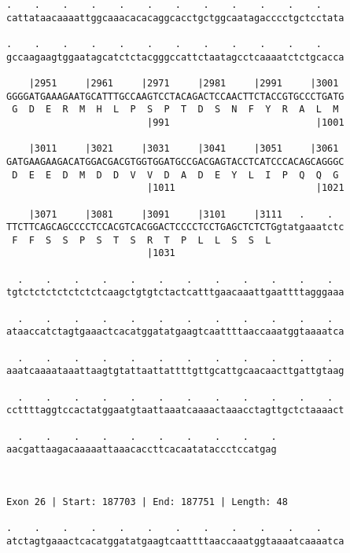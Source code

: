 \documentclass{article}
\begin{document}
\begin{Verbatim}
.    .    .    .    .    .    .    .    .    .    .    .    
cattataacaaaattggcaaacacacaggcacctgctggcaatagacccctgctcctata
                                                            
.    .    .    .    .    .    .    .    .    .    .    .    
gccaagaagtggaatagcatctctacgggccattctaatagcctcaaaatctctgcacca
                                                            
    |2951     |2961     |2971     |2981     |2991     |3001 
GGGGATGAAAGAATGCATTTGCCAAGTCCTACAGACTCCAACTTCTACCGTGCCCTGATG
 G  D  E  R  M  H  L  P  S  P  T  D  S  N  F  Y  R  A  L  M 
                         |991                          |1001
  
    |3011     |3021     |3031     |3041     |3051     |3061 
GATGAAGAAGACATGGACGACGTGGTGGATGCCGACGAGTACCTCATCCCACAGCAGGGC
 D  E  E  D  M  D  D  V  V  D  A  D  E  Y  L  I  P  Q  Q  G 
                         |1011                         |1021
  
    |3071     |3081     |3091     |3101     |3111   .    .  
TTCTTCAGCAGCCCCTCCACGTCACGGACTCCCCTCCTGAGCTCTCTGgtatgaaatctc
 F  F  S  S  P  S  T  S  R  T  P  L  L  S  S  L             
                         |1031                              
  
  .    .    .    .    .    .    .    .    .    .    .    .  
tgtctctctctctctctcaagctgtgtctactcatttgaacaaattgaattttagggaaa
                                                            
  .    .    .    .    .    .    .    .    .    .    .    .  
ataaccatctagtgaaactcacatggatatgaagtcaattttaaccaaatggtaaaatca
                                                            
  .    .    .    .    .    .    .    .    .    .    .    .  
aaatcaaaataaattaagtgtattaattattttgttgcattgcaacaacttgattgtaag
                                                            
  .    .    .    .    .    .    .    .    .    .    .    .  
ccttttaggtccactatggaatgtaattaaatcaaaactaaacctagttgctctaaaact
                                                            
  .    .    .    .    .    .    .    .    .    .
aacgattaagacaaaaattaaacaccttcacaatataccctccatgag
                                                
                                                
 
Exon 26 | Start: 187703 | End: 187751 | Length: 48
 
.    .    .    .    .    .    .    .    .    .    .    .    
atctagtgaaactcacatggatatgaagtcaattttaaccaaatggtaaaatcaaaatca
                                                            

\end{Verbatim}
\end{document}
